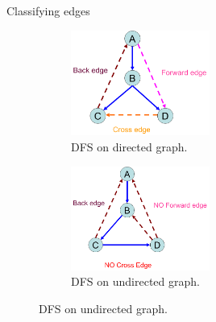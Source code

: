 \begin{frame}{Classifying edges }
  \begin{figure}
    \begin{subfigure}{0.50\linewidth}
      \centering
      \includegraphics[width=0.50\textwidth]{figures/dfs-digraph.png}
      \caption{DFS on directed graph.}
    \end{subfigure}%
    \begin{subfigure}{0.50\linewidth}
      \centering
      \includegraphics[width=0.50\textwidth]{figures/dfs-undirected.png}
      \caption{DFS on undirected graph.}
    \end{subfigure}


\end{figure}
\end{frame}
